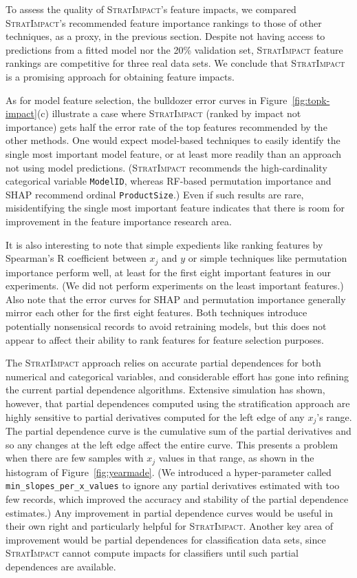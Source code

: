 \documentclass[11pt]{article}
\newcommand{\figref}[1]{Figure~\ref{#1}}
\newcommand{\simp}{\fontfamily{cmr}\textsc{\small StratImpact}}
\begin{document}
To assess the quality of \simp's feature impacts, we compared \simp's recommended feature importance rankings to those of other techniques, as a proxy, in the previous section. Despite not having access to predictions from a fitted model nor the 20\% validation set, \simp{} feature rankings are competitive for three real data sets. We conclude that \simp{} is a promising approach for obtaining feature impacts.  

As for model feature selection, the bulldozer error curves in \figref{fig:topk-impact}(c) illustrate a case where \simp{} (ranked by impact not importance) gets half the error rate of the top features recommended by the other methods.  One would expect model-based techniques to easily identify the single most important model feature, or at least more readily than an approach not using model predictions.  (\simp{} recommends the high-cardinality categorical variable {\tt ModelID}, whereas RF-based permutation importance and SHAP recommend ordinal {\tt ProductSize}.)  Even if such results are rare, misidentifying the single most important feature indicates that there is room for improvement in the feature importance research area. 

It is also interesting to note that simple expedients like ranking features by Spearman's R coefficient between $x_j$ and $y$ or simple techniques like permutation importance perform well, at least for the first eight important features in our experiments. (We did not perform experiments on the least important features.) Also note that the error curves for SHAP and permutation importance generally mirror each other for the first eight features.  Both techniques introduce potentially nonsensical records to avoid retraining models, but this does not appear to affect their ability to rank features for feature selection purposes.

The \simp{} approach relies on accurate partial dependences for both numerical and categorical variables, and considerable effort has gone into refining the current partial dependence algorithms. Extensive simulation has shown, however, that partial dependences computed using the stratification approach are highly sensitive to partial derivatives computed for the left edge of any $x_j$'s range. The partial dependence curve is the cumulative sum of the partial derivatives and so any changes at the left edge affect the entire curve.  This presents a problem when there are few samples with $x_j$ values in that range, as shown in the histogram of \figref{fig:yearmade}. (We introduced a hyper-parameter called {\tt\small min\_slopes\_per\_x\_values} to ignore any partial derivatives estimated with too few records, which improved the accuracy and stability of the partial dependence estimates.)  Any improvement in partial dependence curves would be useful in their own right and particularly helpful for \simp.    Another key area of improvement would be partial dependences for classification data sets, since \simp{} cannot compute impacts for classifiers until such partial dependences are available.
\end{document}
